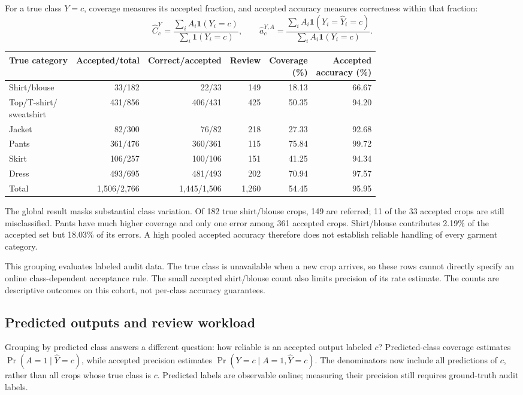 For a true class $Y=c$, coverage measures its accepted fraction, and accepted accuracy measures correctness within that fraction:
\[
 \widehat C^Y_c=\frac{\sum_i A_i\mathbf{1}(Y_i=c)}{\sum_i\mathbf{1}(Y_i=c)},
 \qquad
 \widehat a^{Y,A}_c=\frac{\sum_i A_i\mathbf{1}(Y_i=\hat Y_i=c)}{\sum_i A_i\mathbf{1}(Y_i=c)}.
\]
\begin{center}\small
\setlength{\tabcolsep}{4pt}
\begin{tabular}{lrrrrr}\toprule
True category & Accepted/total & Correct/accepted & Review & \shortstack{Coverage\\(\%)} & \shortstack{Accepted\\accuracy (\%)}\\\midrule
Shirt/blouse & 33/182 & 22/33 & 149 & 18.13 & 66.67\\
\shortstack[l]{Top/T-shirt/\\sweatshirt} & 431/856 & 406/431 & 425 & 50.35 & 94.20\\
Jacket & 82/300 & 76/82 & 218 & 27.33 & 92.68\\
Pants & 361/476 & 360/361 & 115 & 75.84 & 99.72\\
Skirt & 106/257 & 100/106 & 151 & 41.25 & 94.34\\
Dress & 493/695 & 481/493 & 202 & 70.94 & 97.57\\\midrule
Total & 1,506/2,766 & 1,445/1,506 & 1,260 & 54.45 & 95.95\\\bottomrule
\end{tabular}\end{center}
The global result masks substantial class variation. Of 182 true shirt/blouse crops, 149 are referred; 11 of the 33 accepted crops are still misclassified. Pants have much higher coverage and only one error among 361 accepted crops. Shirt/blouse contributes 2.19\% of the accepted set but 18.03\% of its errors. A high pooled accepted accuracy therefore does not establish reliable handling of every garment category.

This grouping evaluates labeled audit data. The true class is unavailable when a new crop arrives, so these rows cannot directly specify an online class-dependent acceptance rule. The small accepted shirt/blouse count also limits precision of its rate estimate. The counts are descriptive outcomes on this cohort, not per-class accuracy guarantees.

\clearpage
\subsection{Predicted outputs and review workload}
Grouping by predicted class answers a different question: how reliable is an accepted output labeled $c$? Predicted-class coverage estimates $\Pr(A=1\mid\hat Y=c)$, while accepted precision estimates $\Pr(Y=c\mid A=1,\hat Y=c)$. The denominators now include all predictions of $c$, rather than all crops whose true class is $c$. Predicted labels are observable online; measuring their precision still requires ground-truth audit labels.

